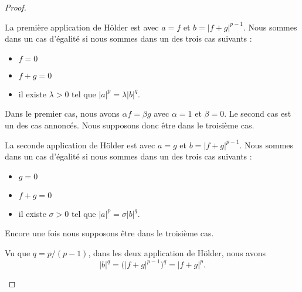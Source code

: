 \begin{proof}
\begin{subproof}
\begin{subproof}
                La première application de Hölder est avec \( a=f\) et \( b=| f+g |^{p-1}\). Nous sommes dans un cas d'égalité si nous sommes dans un des trois cas suivants :
                \begin{itemize}
                    \item \( f=0\)
                    \item \( f+g=0\)
                    \item il existe \( \lambda>0\) tel que \( | a |^p=\lambda | b |^q\).
                \end{itemize}
                Dans le premier cas, nous avons \( \alpha f=\beta g\) avec \( \alpha=1\) et \( \beta=0\). Le second cas est un des cas annoncés. Nous supposons donc être dans le troisième cas.

                La seconde application de Hölder est avec \( a=g\) et \( b=| f+g |^{p-1}\). Nous sommes dans un cas d'égalité si nous sommes dans un des trois cas suivants :
                \begin{itemize}
                    \item \( g=0\)
                    \item \( f+g=0\)
                    \item il existe \( \sigma>0\) tel que \( | a |^p=\sigma | b |^q\).
                \end{itemize}
                Encore une fois nous supposons être dans le troisième cas.

                Vu que \( q=p/(p-1)\), dans les deux application de Hölder, nous avons 
                \begin{equation}
                    | b |^q=\big( | f+g |^{p-1} \big)^q=| f+g |^p.
                \end{equation}
                

\end{subproof}
\end{subproof}
\end{proof}
